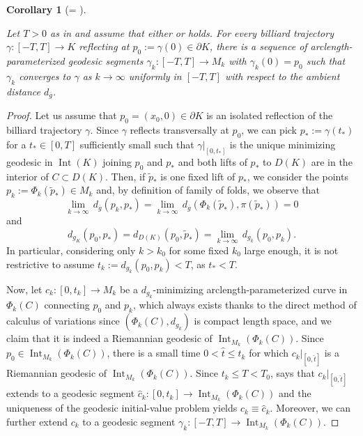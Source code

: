 \documentclass[11pt]{article}
\theoremstyle{definition}
\theoremstyle{remark}
\theoremstyle{plain}
\newtheorem{corollary}[definition]{Corollary}
\DeclareMathOperator{\Int}{Int}
\newcommand{\g}{\overline{g}}
\begin{document}
\begin{corollary}[= ]\label{cor:main_corollary_sec3}

Let $T>0$ as in  and assume that either  or  holds. For every billiard trajectory $\gamma:[-T,T]\to K$ reflecting at $p_0:=\gamma(0)\in \partial K$, there is a sequence of arclength-parameterized geodesic segments $\gamma_k:[-T,T]\rightarrow M_k$ with $\gamma_k(0)=p_0$ such that $\gamma_k$ converges to $\gamma$ as $k\rightarrow \infty$ uniformly in $[-T,T]$ with respect to the ambient distance $d_{\g}$.

\end{corollary}

\begin{proof}
  
Let us assume that $p_0=(x_0,0)\in \partial K$ is an isolated reflection of the billiard trajectory $\gamma$. Since $\gamma$ reflects transversally at $p_0$, we can pick $p_*:=\gamma(t_*)$ for a $t_*\in[0,T]$ sufficiently small such that $\gamma|_{[0,t_*]}$ is the unique minimizing geodesic in $\Int(K)$ joining $p_0$ and $p_*$ and both lifts of $p_*$ to $D(K)$ are in the interior of $C\subset D(K)$. Then, if $\tilde p_*$ is one fixed lift of $p_*$, we consider the points $p_k:= \Phi_k(\tilde p_*)\in M_k$ and, by definition of family of folds, we observe that
$$\lim_{k\to \infty}\, d_{\g}(p_k,p_*) = \lim_{k\to \infty}\, d_{\g}(\Phi_k(\tilde p_*),\pi(\tilde p_*))= 0$$
and
$$d_{g_K}(p_0,p_*) = d_{D(K)}(p_0,\tilde p_*) = \lim_{k\to \infty}\, d_{g_k}(p_0,p_k).$$
In particular, considering only $k>k_0$ for some fixed $k_0$ large enough, it is not restrictive to assume $t_k:=d_{g_k}(p_0,p_k)< T$, as $t_*< T$.

Now, let $c_k:[0,t_k]\rightarrow M_k$ be a $d_{g_k}$-minimizing arclength-parameterized curve in $\Phi_k(C)$ connecting $p_0$ and $p_k$, which always exists thanks to the direct method of calculus of variations since $(\Phi_k(C),d_{g_k})$ is compact length space, and we claim that it is indeed a Riemannian geodesic of $\Int_{M_k}(\Phi_k(C))$. Since $p_0\in\Int_{M_k}(\Phi_k(C))$, there is a small time $0<\hat t\le t_k$ for which $c_k\big|_{[0,\hat t]}$ is a Riemannian geodesic of $\Int_{M_k}(\Phi_k(C))$. Since $t_k\le T<T_0$,  says that $c_k\big|_{[0,\hat t]}$ extends to a geodesic segment $\hat c_k:[0,t_k]\to \Int_{M_k}(\Phi_k(C))$ and the uniqueness of the geodesic initial-value problem yields $c_k \equiv \hat c_k$. Moreover, we can further extend $c_k$ to a geodesic segment $\gamma_k:[-T,T]\rightarrow \Int_{M_k}(\Phi_k(C))$. 


\end{proof}
\end{document}
